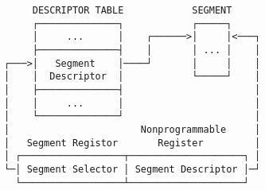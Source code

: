 \documentclass[varwidth,crop]{standalone}
\begin{document}
\begin{verbatim}
     DESCRIPTOR TABLE            SEGMENT
     ┌──────────────┐            ┌─────┐
     │     ...      │    ┌──────>│     │<───┐
     ├──────────────┤    │       │ ... │    │
┌───>│   Segment    │────┘       │     │    │
│    │  Descriptor  │            └─────┘    │
│    ├──────────────┤                       │
│    │     ...      │                       │
│    └──────────────┘                       │
│                       Nonprogrammable     │
│   Segment Registor       Register         │
│ ┌──────────────────┬────────────────────┐ │
└─│ Segment Selector │ Segment Descriptor │─┘
  └──────────────────┴────────────────────┘
\end{verbatim}
\end{document}
